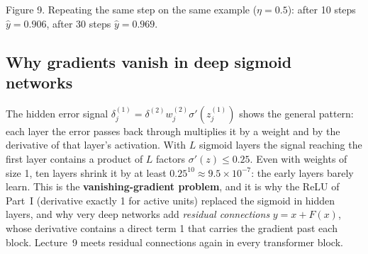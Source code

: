 \documentclass[11pt]{article}
\begin{document}
\begin{center}

\small Figure 9. Repeating the same step on the same example ($\eta=0.5$): after 10 steps $\hat y=0.906$, after 30 steps $\hat y=0.969$.
\end{center}


\subsection{Why gradients vanish in deep sigmoid networks}\label{sec:vanish}
The hidden error signal $\delta^{(1)}_j=\delta^{(2)}w^{(2)}_j\sigma'(z^{(1)}_j)$ shows the general pattern: each layer the error passes back through multiplies it by a weight and by the derivative of that layer's activation. With $L$ sigmoid layers the signal reaching the first layer contains a product of $L$ factors $\sigma'(z)\le0.25$. Even with weights of size 1, ten layers shrink it by at least $0.25^{10}\approx9.5\times10^{-7}$: the early layers barely learn. This is the \textbf{vanishing-gradient problem}, and it is why the ReLU of Part~I (derivative exactly 1 for active units) replaced the sigmoid in hidden layers, and why very deep networks add \emph{residual connections} $y=x+F(x)$, whose derivative contains a direct term 1 that carries the gradient past each block. Lecture~9 meets residual connections again in every transformer block.
\end{document}
